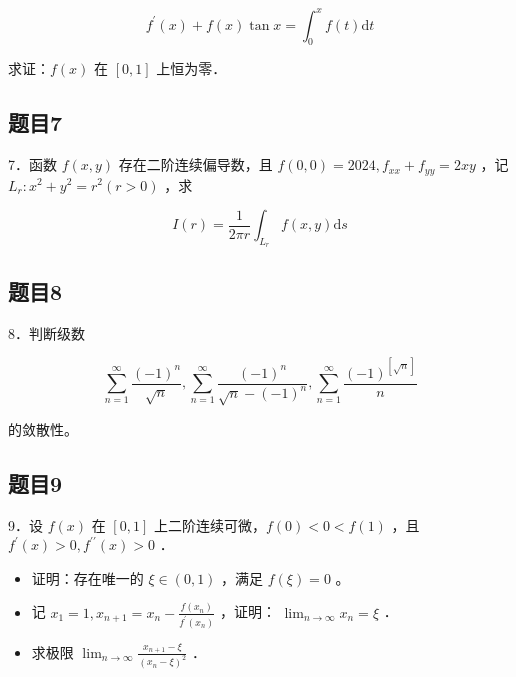 \documentclass{article}
\begin{document}
\[
f^{\prime}(x)+f(x) \tan x=\int_{0}^{x} f(t) \mathrm{d} t
\]

求证：\(f(x)\) 在 \([0,1]\) 上恒为零．

\subsection{题目7}
7．函数 \(f(x, y)\) 存在二阶连续偏导数，且 \(f(0,0)=2024, f_{x x}+f_{y y}=2 x y\) ，记 \(L_{r}: x^{2}+y^{2}=r^{2}(r>0)\) ，求

\[
I(r)=\frac{1}{2 \pi r} \int_{L_{r}} f(x, y) \mathrm{d} s
\]

\subsection{题目8}
8．判断级数

\[
\sum_{n=1}^{\infty} \frac{(-1)^{n}}{\sqrt{n}}, \sum_{n=1}^{\infty} \frac{(-1)^{n}}{\sqrt{n}-(-1)^{n}}, \sum_{n=1}^{\infty} \frac{(-1)^{[\sqrt{n}]}}{n}
\]

的敛散性。

\subsection{题目9}
9．设 \(f(x)\) 在 \([0,1]\) 上二阶连续可微，\(f(0)<0<f(1)\) ，且 \(f^{\prime}(x)>0, f^{\prime \prime}(x)>0\) ．

\begin{itemize}
  \item[（1）] 证明：存在唯一的 \(\xi \in(0,1)\) ，满足 \(f(\xi)=0\) 。
  \item[（2）] 记 \(x_{1}=1, x_{n+1}=x_{n}-\frac{f\left(x_{n}\right)}{f^{\prime}\left(x_{n}\right)}\) ，证明： \(\lim _{n \rightarrow \infty} x_{n}=\xi\) ．
  \item[（3）] 求极限 \(\lim _{n \rightarrow \infty} \frac{x_{n+1}-\xi}{\left(x_{n}-\xi\right)^{2}}\) ．
\end{itemize}
\end{document}

